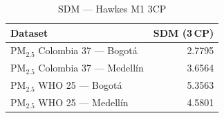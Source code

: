 \begin{table}[htbp]
\centering
\caption{SDM --- Hawkes M1 3CP}
\label{tab:hawkes_sdm_3cp}
\begin{tabular}{lr}
\toprule
Dataset & SDM (3\,CP) \\
\midrule
PM$_{2.5}$ Colombia 37 --- Bogot\'{a} & 2.7795 \\
PM$_{2.5}$ Colombia 37 --- Medell\'{i}n & 3.6564 \\
PM$_{2.5}$ WHO 25 --- Bogot\'{a} & 5.3563 \\
PM$_{2.5}$ WHO 25 --- Medell\'{i}n & 4.5801 \\
\bottomrule
\end{tabular}
\end{table}
